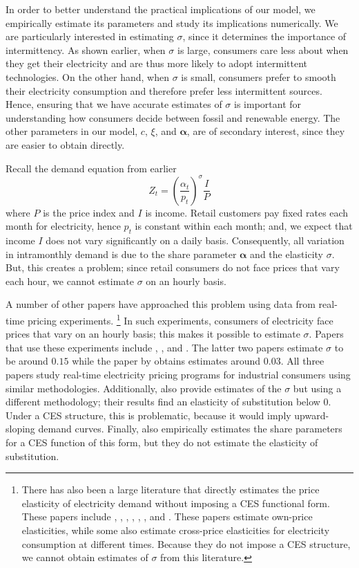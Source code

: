 \documentclass[11pt,a4paper,leqno]{extarticle}
\begin{document}
	In order to better understand the practical implications of our model, we empirically estimate its parameters and study its implications numerically. We are particularly interested in estimating $\sigma$, since it determines the importance of intermittency. As shown earlier, when $\sigma$ is large, consumers care less about when they get their electricity and are thus more likely to adopt intermittent technologies. On the other hand, when $\sigma$ is small, consumers prefer to smooth their electricity consumption and therefore prefer less intermittent sources. Hence, ensuring that we have accurate estimates of $\sigma$ is important for understanding how consumers decide between fossil and renewable energy. The other parameters in our model, $c$,  $\xi$, and $\boldsymbol{\alpha}$, are of secondary interest, since they are easier to obtain directly. 
	
	Recall the demand equation from earlier
	$$Z_t = \left(\frac{\alpha_t}{p_t} \right)^\sigma \frac{I}{P}$$
	where $P$ is the price index and $I$ is income. Retail customers pay fixed rates each month for electricity, hence $p_t$ is constant within each month; and, we expect that income $I$ does not vary significantly on a daily basis. Consequently, all variation in intramonthly demand is due to the share parameter $\boldsymbol{\alpha}$ and the elasticity $\sigma$. But, this creates a problem; since retail consumers do not face prices that vary each hour, we cannot estimate  $\sigma$ on an hourly basis. 
	
	A number of other papers have approached this problem using data from real-time pricing experiments.
	\footnote{ There has also been a large literature that directly estimates the price elasticity of electricity demand without imposing a CES functional form. These papers include \citet{Wolak}, \citet{Zarnikau}, \citet{Woo}, \citet{Zhou}, \citet{Reiss}, \citet{Fan}, and \citet{Deryugina}. These papers estimate own-price elasticities, while some also estimate cross-price elasticities for electricity consumption at different times. Because they do not impose a CES structure, we cannot obtain estimates of $\sigma$ from this literature. } In such experiments, consumers of electricity face prices that vary on an hourly basis; this makes it possible to estimate $\sigma$. Papers that use these experiments include \citet{Schwarz}, \citet{Herriges}, and \citet{KS1994}.
	The latter two papers estimate $\sigma$ to be around $0.15$ while the paper by \citeauthor{Schwarz}  obtains estimates around $0.03$. All three papers study real-time electricity pricing programs for industrial consumers using similar methodologies. Additionally, \citet{Aubin} also provide estimates of the $\sigma$ but using a different methodology; their results find an elasticity of substitution below 0. Under a CES structure, this is problematic, because it would imply upward-sloping demand curves. Finally, \citet{Moha2016} also empirically estimates the share parameters for a CES function of this form, but they do not estimate the elasticity of substitution. 
	
\end{document}
